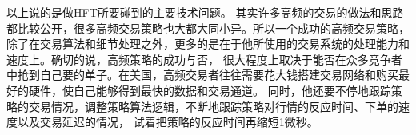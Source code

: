 以上说的是做HFT所要碰到的主要技术问题。 其实许多高频的交易的做法和思路都比较公开，很多高频交易策略也大都大同小异。所以一个成功的高频交易策略，
除了在交易算法和细节处理之外，更多的是在于他所使用的交易系统的处理能力和速度上。确切的说，高频策略的成功与否，
很大程度上取决于能否在众多竞争者中抢到自己要的单子。在美国，高频交易者往往需要花大钱搭建交易网络和购买最好的硬件，使自己能够得到最快的数据和交易通道。
同时，他还要不停地跟踪策略的交易情况，调整策略算法逻辑，不断地跟踪策略对行情的反应时间、下单的速度以及交易延迟的情况，
试着把策略的反应时间再缩短1微秒。


